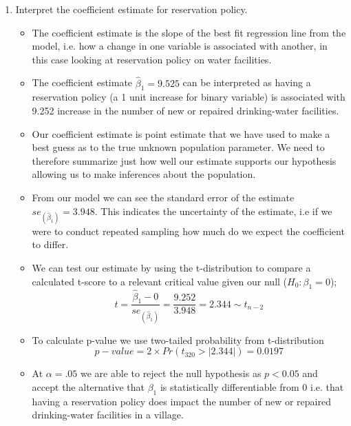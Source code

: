 \documentclass[12pt,letterpaper]{article}
\begin{document}
\begin{enumerate}
\begin{verbatim}
		Residual standard error: 33.45 on 320 degrees of freedom
		Multiple R-squared:  0.01688,	Adjusted R-squared:  0.0138 
		F-statistic: 5.493 on 1 and 320 DF,  p-value: 0.0197
	\end{verbatim}
	\vspace{1cm}
	\item [(c)] Interpret the coefficient estimate for reservation policy. 
	\begin{itemize}
		\item 	The coefficient estimate is the slope of the best fit regression line from the model, i.e. how a change in one variable is associated with another, in this case looking at reservation policy on water facilities.
		\item The coefficient estimate $\hat\beta_1=9.525$ can be interpreted as having a reservation policy (a 1 unit increase for binary variable) is associated with 9.252 increase in the number of new or repaired drinking-water facilities.
		\item Our coefficient estimate is point estimate that we have used to make a best guess as to the true unknown population parameter. We need to therefore summarize just how well our estimate supports our hypothesis allowing us to make inferences about the population. 
		\item From our model we can see the standard error of the estimate $se_(\hat\beta_1) = 3.948$. This indicates the uncertainty of the estimate, i.e if we were to conduct repeated sampling how much do we expect the coefficient to differ. 
		\item We can test our estimate by using the t-distribution to compare a calculated t-score to a relevant critical value given our null ($H_0: \beta_1 = 0$); \begin{equation}
			t = \frac{\hat{\beta}_1 -0}{se_(\hat{\beta}_1)} = \frac{9.252}{3.948} = 2.344 \sim t_{n-2}
		\end{equation}
		\item  To calculate p-value we use two-tailed probability from t-distribution
			\begin{equation}
				p-value = 2 \times Pr(t_{320} > |2.344|) = 0.0197
				\end{equation}
		\item At $\alpha= .05$ we are able to reject the null hypothesis as $p <0.05$ and accept the alternative that $\beta_1$ is statistically differentiable from 0 i.e.  that having a reservation policy does impact the number of new or repaired drinking-water facilities in a village. 

\end{itemize}
\end{enumerate}
\end{document}
